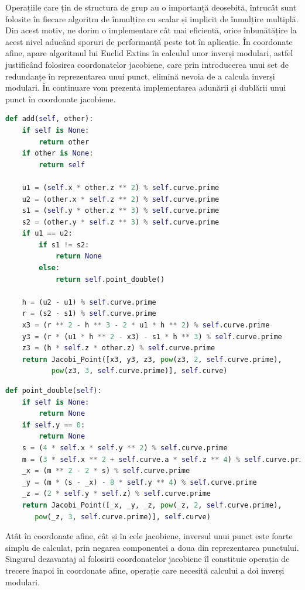 Operațiile care țin de structura de grup au o importanță deosebită, întrucât sunt folosite în fiecare algoritm de înmulțire cu scalar și implicit de înmulțire multiplă. Din acest motiv, ne dorim o implementare cât mai eficientă, orice înbunătățire la acest nivel aducând sporuri de performanță peste tot în aplicație. În coordonate afine, apare algoritmul lui Euclid Extins în calculul unor inverși modulari, astfel justificând folosirea coordonatelor jacobiene, care prin introducerea unui set de redundanțe în reprezentarea unui punct, elimină nevoia de a calcula inverși modulari. În continuare vom prezenta implementarea adunării și dublării unui punct în coordonate jacobiene. 

\begin{lstlisting}[language=Python]
def add(self, other):
    if self is None:
        return other
    if other is None:
        return self

    u1 = (self.x * other.z ** 2) % self.curve.prime
    u2 = (other.x * self.z ** 2) % self.curve.prime
    s1 = (self.y * other.z ** 3) % self.curve.prime
    s2 = (other.y * self.z ** 3) % self.curve.prime
    if u1 == u2:
        if s1 != s2:
            return None
        else:
            return self.point_double()

    h = (u2 - u1) % self.curve.prime
    r = (s2 - s1) % self.curve.prime
    x3 = (r ** 2 - h ** 3 - 2 * u1 * h ** 2) % self.curve.prime
    y3 = (r * (u1 * h ** 2 - x3) - s1 * h ** 3) % self.curve.prime
    z3 = (h * self.z * other.z) % self.curve.prime
    return Jacobi_Point([x3, y3, z3, pow(z3, 2, self.curve.prime), 
           pow(z3, 3, self.curve.prime)], self.curve)
\end{lstlisting}

\begin{lstlisting}[language=Python]
def point_double(self):
    if self is None:
        return None
    if self.y == 0:
        return None
    s = (4 * self.x * self.y ** 2) % self.curve.prime
    m = (3 * self.x ** 2 + self.curve.a * self.z ** 4) % self.curve.prime
    _x = (m ** 2 - 2 * s) % self.curve.prime
    _y = (m * (s - _x) - 8 * self.y ** 4) % self.curve.prime
    _z = (2 * self.y * self.z) % self.curve.prime
    return Jacobi_Point([_x, _y, _z, pow(_z, 2, self.curve.prime), 
	   pow(_z, 3, self.curve.prime)], self.curve)
\end{lstlisting}

Atât în coordonate afine, cât și în cele jacobiene, inversul unui punct este foarte simplu de calculat, prin negarea componentei a doua din reprezentarea punctului. Singurul dezavantaj al folosirii coordonatelor jacobiene îl constituie operația de trecere înapoi în coordonate afine, operație care necesită calcului a doi inverși modulari.

